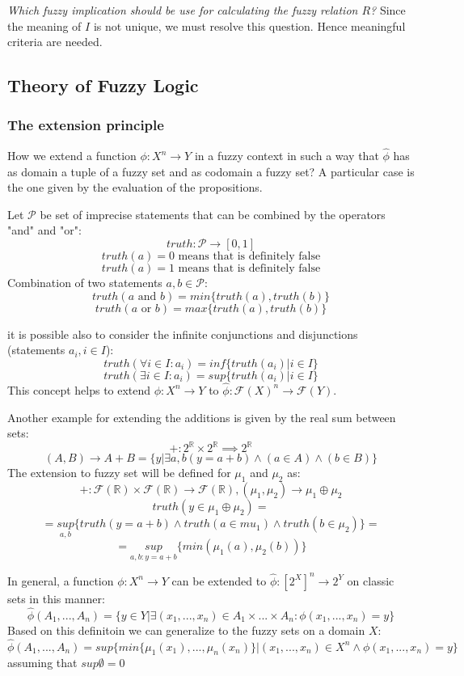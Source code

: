 \documentclass{article}
\begin{document}
\textit{Which fuzzy implication should be use for
    calculating the fuzzy relation $R$?} Since the meaning of $I$ is not unique, we must resolve this
question. Hence meaningful criteria are needed.

\subsection{Theory of Fuzzy Logic}
\subsubsection{The extension principle}
How we extend a function $\phi:X^n\rightarrow Y$ in a fuzzy context in such a way that $\hat{\phi}$
has as domain a tuple of a fuzzy set and as codomain a fuzzy set? A particular case is the
one given by the evaluation of the propositions.

Let $\mathcal{P}$ be set of imprecise statements that can be combined by the operators "and" and "or":
$$truth:\mathcal{P}\rightarrow[0,1]$$
$$truth(a)=0 \text{ means that is definitely false}$$
$$truth(a)=1\text{ means that is definitely false}$$
Combination of two statements $a,b\in\mathcal{P}$:
$$truth(a \text{ and } b)=min\{truth(a),truth(b)\}$$
$$truth(a \text{ or } b)=max\{truth(a),truth(b)\}$$

it is possible also to consider the infinite conjunctions and disjunctions (statements $a_i,i \in I$):
$$truth(\forall i\in I:a_i)=inf\{truth(a_i)|i\in I\}$$
$$truth(\exists i\in I:a_i)=sup\{truth(a_i)|i\in I\}$$
This concept helps to extend $\phi:X^n \rightarrow Y$ to $\hat{\phi}:\mathcal{F}(X)^n \rightarrow\mathcal{F}(Y)$.

Another example for extending the additions is given by the real sum between sets:
$$+:2^{\mathbb{R}}\times 2^{\mathbb{R}}\implies 2^{\mathbb{R}}$$
$$(A,B)\rightarrow A+B=\{ y | \exists a,b(y=a+b) \land (a\in A)\land (b\in B)\}$$
The extension to fuzzy set will be defined for $\mu_1$ and $\mu_2$ as:
$$+:\mathcal{F}(\mathbb{R})\times\mathcal{F}(\mathbb{R})\rightarrow \mathcal{F}(\mathbb{R}),(\mu_1,\mu_2)\rightarrow \mu_1 \oplus\mu_2$$
$$truth(y\in \mu_1\oplus\mu_2) =$$
$$=\underset{a,b}{sup}\{truth(y=a+b) \land truth(a\in mu_1)\land truth(b\in \mu_2)\}=$$
$$=\underset{a,b:y=a+b}{sup}\{min(\mu_1(a),\mu_2(b))\}$$

In general, a function $\phi:X^n\rightarrow Y$ can be extended to $\hat{\phi}:[2^X]^n\rightarrow 2^Y$
on classic sets in this manner:
$$\hat{\phi}(A_1,...,A_n)=\{y\in Y|\exists (x_1,...,x_n)\in A_1\times ... \times A_n:
    \phi(x_1,...,x_n)=y\}$$
Based on this definitoin we can generalize to the fuzzy sets on a domain $X$:
$$\hat{\phi}(A_1,...,A_n)=sup\{min\{\mu_1(x_1),...,\mu_n(x_n)\} | (x_1,...,x_n)\in X^n \land \phi(x_1,...,x_n)=y\}$$
assuming that $sup \emptyset=0$
\end{document}
